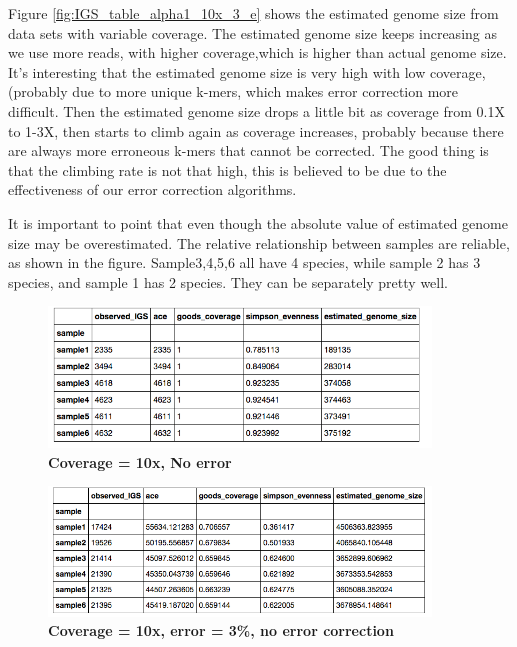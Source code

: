 \documentclass[12pt]{report}
\begin{document}

Figure \ref{fig:IGS_table_alpha1_10x_3_e} shows the estimated genome size from data sets with variable coverage.
The estimated genome size keeps increasing as we use more reads, with higher coverage,which is  higher than actual genome size.
It's interesting that the estimated genome size is very high with low coverage, (probably due to more unique k-mers, which makes error correction more difficult. Then the estimated genome size drops a little bit as coverage from 0.1X to 1-3X, then starts to climb again as coverage increases, probably because there are always more erroneous k-mers that cannot be corrected. The good thing is that the climbing rate is not that high, this is believed to be due to the effectiveness of our error correction algorithms.

It is important to point that even though the absolute value of estimated genome size may be overestimated. The relative relationship between samples are reliable, as shown in the figure. Sample3,4,5,6 all have 4 species, while sample 2 has 3 species, and sample 1 has 2 species. They can be separately pretty well.


\begin{figure}[!ht]
 \centerline{\includegraphics[width=4in]{./figures/IGS_table_alpha1_10x_0.png}}
\caption{\bf Coverage = 10x, No error}
\label{fig:IGS_table_alpha1_10x_0}
\end{figure}


\begin{figure}[!ht]
 \centerline{\includegraphics[width=4in]{./figures/IGS_table_alpha1_10x_3_ne.png}}
\caption{\bf Coverage = 10x, error = 3\%, no error correction}
\label{fig:IGS_table_alpha1_10x_3_ne}
\end{figure}
\end{document}
